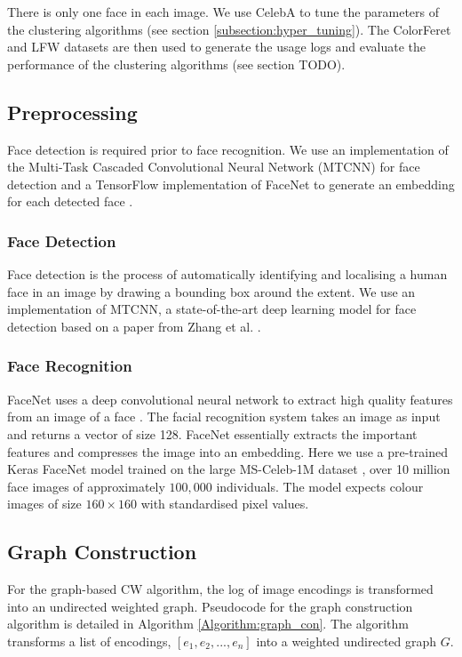 \documentclass[a4paper,12pt]{report}
\begin{document}
	There is only one face in each image. We use CelebA to tune the parameters of the clustering algorithms (see section \ref{subsection:hyper_tuning}). The ColorFeret and LFW datasets are then used to generate the usage logs and evaluate the performance of the clustering algorithms (see section TODO). 
	
	\subsection{Preprocessing}
	\label{subsection:preprocessing}
	Face detection is required prior to face recognition. We use an implementation of the Multi-Task Cascaded Convolutional Neural Network (MTCNN) for face detection and a TensorFlow implementation of FaceNet to generate an embedding for each detected face \cite{davidsan69:online}. 
	
	\subsubsection{Face Detection}
	Face detection is the process of automatically identifying and localising a human face in an image by drawing a bounding box around the extent. We use an implementation of MTCNN, a state-of-the-art deep learning model for face detection based on a paper from Zhang et al. \cite{DBLP:journals/corr/ZhangZL016}.
	
	\subsubsection{Face Recognition}
	FaceNet uses a deep convolutional neural network to extract high quality features from an image of a face \cite{schroff2015facenet}. The facial recognition system takes an image as input and returns a vector of size 128. FaceNet essentially extracts the important features and compresses the image into an embedding. Here we use a pre-trained Keras FaceNet model \cite{nyokimtl39:online} trained on the large MS-Celeb-1M dataset \cite{Guo2016MSCeleb1MAD}, over 10 million face images of approximately $100,000$ individuals. The model expects colour images of size $160 \times 160$ with standardised pixel values.
	
	\subsection{Graph Construction}
	For the graph-based CW algorithm, the log of image encodings is transformed into an undirected weighted graph. Pseudocode for the graph construction algorithm is detailed in Algorithm \ref{Algorithm:graph_con}. The algorithm transforms a list of encodings, $[e_1, e_2, ..., e_n]$ into a weighted undirected graph $G$. 
	
\end{document}
